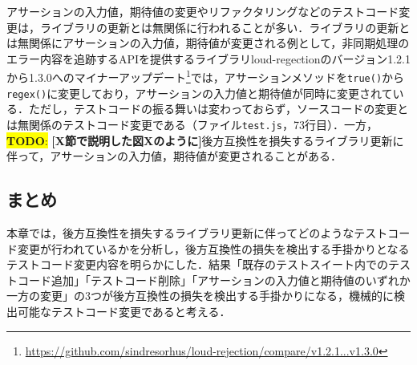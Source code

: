 \documentclass[submit]{ipsj}
\newcommand{\todo}[1]{\colorbox{yellow}{{\bf TODO}:}{\color{red} {\textbf{[#1]}}}}
\begin{document}
アサーションの入力値，期待値の変更やリファクタリングなどのテストコード変更は，ライブラリの更新とは無関係に行われることが多い．ライブラリの更新とは無関係にアサーションの入力値，期待値が変更される例として，非同期処理のエラー内容を追跡するAPIを提供するライブラリloud-regectionのバージョン1.2.1から1.3.0へのマイナーアップデート\footnote{\url{https://github.com/sindresorhus/loud-rejection/compare/v1.2.1...v1.3.0}}では，アサーションメソッドを{\verb|true()|}から{\verb|regex()|}に変更しており，アサーションの入力値と期待値が同時に変更されている．ただし，テストコードの振る舞いは変わっておらず，ソースコードの変更とは無関係のテストコード変更である（ファイル\verb|test.js|，73行目）．一方，\todo{X節で説明した図Xのように}後方互換性を損失するライブラリ更新に伴って，アサーションの入力値，期待値が変更されることがある．


\subsection{まとめ}
本章では，後方互換性を損失するライブラリ更新に伴ってどのようなテストコード変更が行われているかを分析し，後方互換性の損失を検出する手掛かりとなるテストコード変更内容を明らかにした．結果「既存のテストスイート内でのテストコード追加」「テストコード削除」「アサーションの入力値と期待値のいずれか一方の変更」の3つが後方互換性の損失を検出する手掛かりになる，機械的に検出可能なテストコード変更であると考える．
\end{document}
